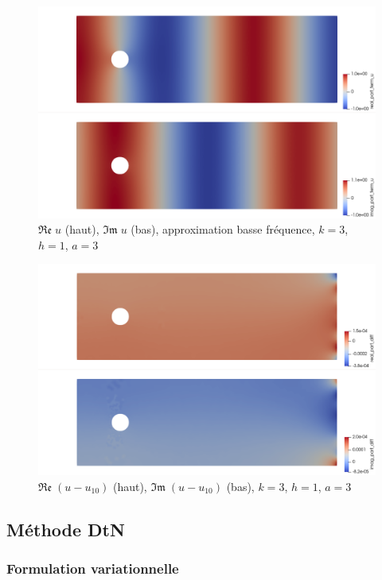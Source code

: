\documentclass{article}
\begin{document}
\begin{figure}[h!]
    \centering
    \includegraphics[scale=0.3]{sc_LF_k3_b3.png}
    \caption{$\mathfrak{Re }\; u$ (haut), $\mathfrak{Im }\; u$ (bas), approximation basse fréquence, $k=3$, $h=1$,  $a=3$}
\end{figure}

\begin{figure}[h!]
    \centering
    \includegraphics[scale=0.3]{sc_diff_LF_DtN10_k3_b3.png}
    \caption{$\mathfrak{Re }\; (u-u_{10})$ (haut), $\mathfrak{Im }\; (u-u_{10})$ (bas), $k=3$, $h=1$,  $a=3$}
\end{figure}

\newpage
\subsection{Méthode DtN}
\subsubsection{Formulation variationnelle}
\end{document}
